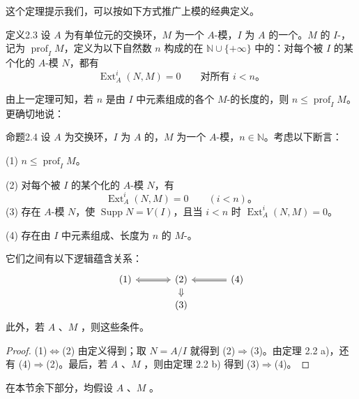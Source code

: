 这个定理提示我们，可以按如下方式推广上模的经典定义。
\begin{SGAresult}{定义}{2.3}
设 $A$ 为有单位元的交换环，$M$ 为一个 $A$-模，$I$ 为 $A$ 的一个。$M$ 的 $I$-，记为 $\operatorname{prof}_I M$，定义为以下自然数 $n$ 构成的在 $\mathbb N\cup\{+\infty\}$ 中的：对每个被 $I$ 的某个化的 $A$-模 $N$，都有
\[
\operatorname{Ext}_A^i(N,M)=0\qquad\text{对所有 }i<n。
\]
\end{SGAresult}
由上一定理可知，若 $n$ 是由 $I$ 中元素组成的各个 $M$-的长度的，则 $n\le\operatorname{prof}_IM$。更确切地说：
\begin{SGAresult}{命题}{2.4}
设 $A$ 为交换环，$I$ 为 $A$ 的，$M$ 为一个 $A$-模，$n\in\mathbb N$。考虑以下断言：

\textnormal{(1)} $n\le\operatorname{prof}_IM$。

\textnormal{(2)} 对每个被 $I$ 的某个化的 $A$-模 $N$，有
\[
\operatorname{Ext}_A^i(N,M)=0\qquad(i<n)。
\]
\textnormal{(3)} 存在 $A$-模 $N$，使 $\operatorname{Supp}N=V(I)$，且当 $i<n$ 时 $\operatorname{Ext}_A^i(N,M)=0$。

\textnormal{(4)} 存在由 $I$ 中元素组成、长度为 $n$ 的 $M$-。

它们之间有以下逻辑蕴含关系：
\[
\begin{tikzcd}[column sep=large,row sep=small]
(1)\arrow[r,Leftrightarrow] & (2)\arrow[d,Rightarrow] & (4)\arrow[l,Rightarrow]\\
& (3) &
\end{tikzcd}
\]
此外，若 $A$ 、$M$ ，则这些条件。
\end{SGAresult}
\begin{proof}
(1)$\Leftrightarrow$(2) 由定义得到；取 $N=A/I$ 就得到 (2)$\Rightarrow$(3)。由定理 2.2 a)，还有 (4)$\Rightarrow$(2)。最后，若 $A$ 、$M$ ，则由定理 2.2 b) 得到 (3)$\Rightarrow$(4)。
\end{proof}
在本节余下部分，均假设 $A$ 、$M$ 。

